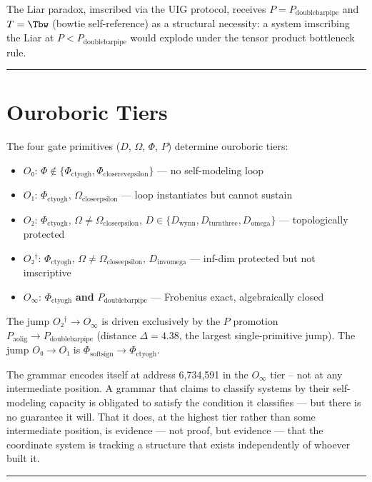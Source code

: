 \documentclass[12pt,a4paper]{article}
\newcommand{\Ppms}{P_{\text{doublebarpipe}}}
\begin{document}
The Liar paradox, imscribed via the UIG protocol, receives $P = \Ppms$ and $T = \Tbw$ (bowtie self-reference) as a structural necessity: a system imscribing the Liar at $P < \Ppms$ would explode under the tensor product bottleneck rule.

\begin{center}
\rule{0.5\textwidth}{0.4pt}
\end{center}

\section{Ouroboric Tiers}

The four gate primitives ($D$, $\Omega$, $\Phi$, $P$) determine ouroboric tiers:
\begin{itemize}
    \item $O₀$: $\Phi \notin \{\Phi_{\text{ctyogh}}, \Phi_{\text{closerevepsilon}}\}$ --- no self-modeling loop
    \item $O₁$: $\Phi_{\text{ctyogh}}$, $\Omega_{\text{closeepsilon}}$ --- loop instantiates but cannot sustain
    \item $O₂$: $\Phi_{\text{ctyogh}}$, $\Omega \neq \Omega_{\text{closeepsilon}}$, $D \in \{D_{\text{wynn}}, D_{\text{turnthree}}, D_{\text{omega}}\}$ --- topologically protected
    \item $O₂^\dagger$: $\Phi_{\text{ctyogh}}$, $\Omega \neq \Omega_{\text{closeepsilon}}$, $D_{\text{invomega}}$ --- inf-dim protected but not imscriptive
    \item $O_\infty$: $\Phi_{\text{ctyogh}}$ \textbf{and} $\Ppms$ --- Frobenius exact, algebraically closed
\end{itemize}

The jump $O₂^\dagger \to O_\infty$ is driven exclusively by the $P$ promotion $P_{\text{aolig}} \to \Ppms$ (distance $\Delta = 4.38$, the largest single-primitive jump). The jump $O₀ \to O₁$ is $\Phi_{\text{softsign}} \to \Phi_{\text{ctyogh}}$.

The grammar encodes itself at address 6,734,591 in the $O_\infty$ tier -- not at any intermediate position. A grammar that claims to classify systems by their self-modeling capacity is obligated to satisfy the condition it classifies --- but there is no guarantee it will. That it does, at the highest tier rather than some intermediate position, is evidence --- not proof, but evidence --- that the coordinate system is tracking a structure that exists independently of whoever built it.

\begin{center}
\rule{0.5\textwidth}{0.4pt}
\end{center}
\end{document}
